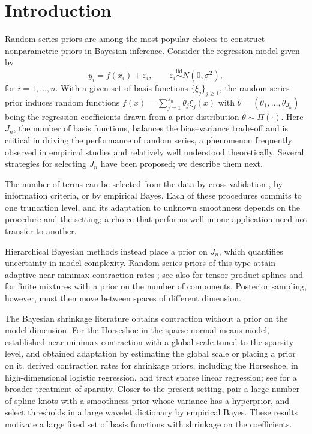 \section{Introduction}\label{sec-intro}

Random series priors are among the most popular choices to construct nonparametric priors in Bayesian inference. Consider the regression model given by
\begin{equation} \label{eq:model}
    y_{i} = f(x_{i}) + \varepsilon_{i}, \qquad \varepsilon_{i}\overset{\mathrm{iid}}{\sim} N(0,\sigma^{2}),
\end{equation}
for $i=1,\ldots,n$. With a given set of basis functions $\{\xi_{j}\}_{j \geq 1}$, the random series prior
induces random functions $f(x) = \sum_{j=1}^{J_n}\theta_{j} \xi_{j}(x) $ with $\theta = (\theta_1, \ldots, \theta_{J_n})$ being the regression coefficients drawn from a prior distribution $\theta \sim \Pi(\cdot)$. Here $J_n$, the number of basis functions, balances the bias--variance trade-off and is critical in driving the performance of random series, a phenomenon frequently observed in empirical studies and relatively well understood theoretically. Several strategies for selecting $J_n$ have been proposed; we describe them next.

The number of terms can be selected from the data by cross-validation \citep{Ruppert2002}, by information criteria, or by empirical Bayes. Each of these procedures commits to one truncation level, and its adaptation to unknown smoothness depends on the procedure and the setting; a choice that performs well in one application need not transfer to another.

Hierarchical Bayesian methods instead place a prior on $J_n$, which quantifies uncertainty in model complexity. Random series priors of this type attain adaptive near-minimax contraction rates \citep{Arbel2013,ShenGhosal2015}; see also \citet{deJonge2012} for tensor-product splines and \citet{GuhaHoNguyen2021} for finite mixtures with a prior on the number of components. Posterior sampling, however, must then move between spaces of different dimension.

The Bayesian shrinkage literature obtains contraction without a prior on the model dimension. For the Horseshoe in the sparse normal-means model, \citet{VanDerPas2014} established near-minimax contraction with a global scale tuned to the sparsity level, and \citet{VanDerPas2017} obtained adaptation by estimating the global scale or placing a prior on it. \citet{WeiGhosal2020} derived contraction rates for shrinkage priors, including the Horseshoe, in high-dimensional logistic regression, and \citet{Castillo2015} treat sparse linear regression; see \citet{Buhlmann2011} for a broader treatment of sparsity. Closer to the present setting, \citet{Bach2021} pair a large number of spline knots with a smoothness prior whose variance has a hyperprior, and \citet{Johnstone2005} select thresholds in a large wavelet dictionary by empirical Bayes. These results motivate a large fixed set of basis functions with shrinkage on the coefficients.

